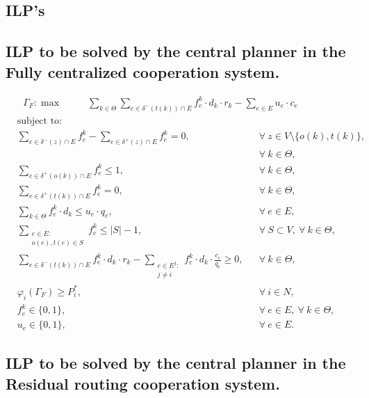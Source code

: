 \documentclass{article}
\begin{document}
\begin{appendices}
\section{ILP's}

\subsection{ILP to be solved by the central planner in the Fully centralized cooperation system.}
\label{seq:appendixilpfull}
    \begin{align}
        &  \Gamma_F: \max  & \hspace{22pt} \sum_{k\in \Theta} \sum_{e \in \delta^-(t(k))\cap E}  f_e^k \cdot d_k \cdot r_k - \sum_{e\in E} u_{e}\cdot c_{e} \hspace{40pt} && 
    \end{align}
    \begin{align}
        & \text{subject to:}       && \nonumber \\
        & \sum_{e \in \delta^-(z)\cap E} f_e^k -\sum_{e \in \delta^+(z)\cap E} f_{e}^k = 0,\quad && \forall\ z\in V\setminus\{o(k),t(k)\},\nonumber\\
        & && \forall\ k\in\Theta, \\
& \sum_{e \in \delta^+(o(k))\cap E} f_e^k \leq 1, && \forall\ k\in \Theta, \\
 & \sum_{e \in \delta^+(t(k))\cap E} f_e^k = 0,  && \forall\ k\in \Theta,  \\
& \sum_{k \in \Theta} f_e^k\cdot d_k  \leq u_e\cdot q_e, && \forall\ e \in E,   \\
 & \sum_{\substack{e \in E\colon \\ o(e),t(e) \in S}} f_e^k \leq |S| -1, && \forall\ S \subset V,\ \forall\ k \in \Theta,\\
&\sum_{e \in \delta^-(t(k))\cap E}  f_e^k  \cdot d_k \cdot r_k - \sum_{\substack{e \in E^j\colon \\ j\not = i}} f_e^k \cdot d_k \cdot \frac{c_e}{q_e}\geq 0, && \forall\ k \in \Theta, \\
& \varphi_i(\Gamma_F) \geq P_i^*,  && \forall\ i\in N, \\
& f_e^k \in \{0,1\},  && \forall\ e \in E,\ \forall\ k \in \Theta,  \\
&  u_e  \in \{0,1\},  && \forall\ e \in E.
   \end{align}

\subsection{ILP to be solved by the central planner in the Residual routing cooperation system.}
\label{seq:appendixilpresidual}


\end{appendices}
\end{document}
